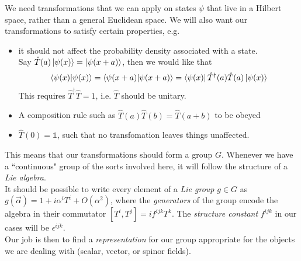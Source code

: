 \documentclass[11pt]{article}
\begin{document}
	\noindent {\textcolor{VioletRed}{\large \bf My understanding:}}
	{\color{darkgray}
		We need transformations that we can apply on states $\psi$ that live in a Hilbert space, rather than a general Euclidean space. We will also want our transformations to satisfy certain properties, e.g. 
		\vspace{-4pt}
		\begin{itemize}
			\item it should not affect the probability density associated with a state.\\
			 Say $\hat{T}(a) \ket{\psi(x)} = \ket{\psi(x+a)}$, then we would like that  %
			 $$\bra{\psi(x)}\ket{\psi(x)} = \bra{\psi(x+a)}\ket{\psi(x+a)} = \bra{\psi(x)}\hat{T}^\dagger(a)\hat{T}(a)\ket{\psi(x)}$$
			 This requires $\hat{T}^\dagger\hat{T} = 1$, i.e. $\hat{T}$ should be unitary.
			 \vspace{-6pt}
			 \item A composition rule such as $\hat{T}(a)\hat{T}(b) = \hat{T}(a+b)$ to be obeyed
			 \vspace{-6pt}
			 \item $\hat{T}(0) = \mathbb{1}$, such that no transfomation leaves things unaffected.
		\end{itemize}
	\vspace{-4pt}
	This means that our transformations should form a group $G$. Whenever we have a ``continuous" group of the sorts involved here, it will follow the structure of a \textit{Lie algebra}. \vspace{4pt} \\
	It should be possible to write every element of a \textit{Lie group} $g \in G$ as $g(\vec{\alpha}) = 1 + i\alpha^i T^i + O(\alpha^2)$, where the \textit{generators} of the group encode the algebra in their commutator
	 $[T^i, T^j] = i f^{ijk} T^k$. The \textit{structure constant} $f^{ijk}$ in our cases will be $\epsilon^{ijk}$.\vspace{4pt} \\ Our job is then to find a \textit{representation} for our group appropriate for the objects we are dealing with (scalar, vector, or spinor fields).\\
	 
	}
\end{document}
